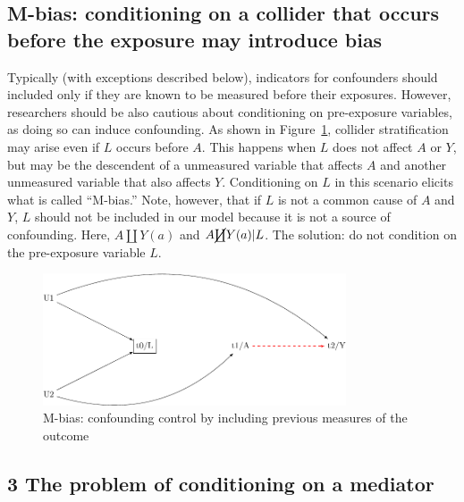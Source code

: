 \documentclass[
  singlecolumn]{report}
\begin{document}
\hypertarget{m-bias-conditioning-on-a-collider-that-occurs-before-the-exposure-may-introduce-bias}{%
\subsection{M-bias: conditioning on a collider that occurs before the
exposure may introduce
bias}\label{m-bias-conditioning-on-a-collider-that-occurs-before-the-exposure-may-introduce-bias}}

Typically (with exceptions described below), indicators for confounders
should included only if they are known to be measured before their
exposures. However, researchers should be also cautious about
conditioning on pre-exposure variables, as doing so can induce
confounding. As shown in Figure~\ref{fig-m-bias}, collider
stratification may arise even if \(L\) occurs before \(A\). This happens
when \(L\) does not affect \(A\) or \(Y\), but may be the descendent of
a unmeasured variable that affects \(A\) and another unmeasured variable
that also affects \(Y\). Conditioning on \(L\) in this scenario elicits
what is called ``M-bias.'' Note, however, that if \(L\) is not a common
cause of \(A\) and \(Y\), \(L\) should not be included in our model
because it is not a source of confounding. Here, \(A \coprod Y(a)\) and
\(A \cancel{\coprod} Y(a)| L\). The solution: do not condition on the
pre-exposure variable \(L\).

\begin{figure}

{\centering \includegraphics[width=0.8\textwidth,height=\textheight]{causal-dags_files/figure-pdf/fig-m-bias-1.pdf}

}

\caption{\label{fig-m-bias}M-bias: confounding control by including
previous measures of the outcome}

\end{figure}

\hypertarget{the-problem-of-conditioning-on-a-mediator}{%
\subsection{3 The problem of conditioning on a
mediator}\label{the-problem-of-conditioning-on-a-mediator}}
\end{document}
